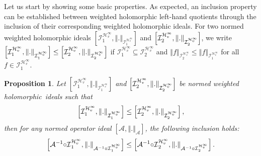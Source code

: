 \documentclass[12pt]{amsart}
\theoremstyle{plain}
\newtheorem{proposition}[theorem]{Proposition}
\numberwithin{equation}{section}
\begin{document}
Let us start by showing some basic properties. 
As expected, an inclusion property can be established between weighted
holomorphic left-hand quotients through the inclusion of their corresponding
weighted holomorphic ideals. For two normed weighted holomorphic  ideals $\left[ \mathcal{I}_{1}^{\mathcal{H}_{v}^{\infty }},\left\Vert
.\right\Vert _{\mathcal{I}_{1}^{\mathcal{H}_{v}^{\infty }}}\right] $ and $%
\left[ \mathcal{I}_{2}^{\mathcal{H}_{v}^{\infty }},\left\Vert .\right\Vert _{%
\mathcal{I}_{2}^{\mathcal{H}_{v}^{\infty }}}\right] $, we
write $\left[ \mathcal{I}_{1}^{\mathcal{H}_{v}^{\infty }},\left\Vert .\right\Vert _{%
\mathcal{I}_{1}^{\mathcal{H}_{v}^{\infty }}}\right] \leq \left[ \mathcal{I}%
_{2}^{\mathcal{H}_{v}^{\infty }},\left\Vert .\right\Vert _{\mathcal{I}_{2}^{%
\mathcal{H}_{v}^{\infty }}}\right] $ if $\mathcal{I}_{1}^{\mathcal{H}_{v}^{\infty }}\subseteq \mathcal{I}_{2}^{\mathcal{H}_{v}^{\infty }}$ and $\left\Vert
f\right\Vert _{\mathcal{I}_{2}^{\mathcal{H}_{v}^{\infty }}}\leq \left\Vert f\right\Vert _{\mathcal{I}_{1}^{\mathcal{H}_{v}^{\infty }}}$ for all $f\in \mathcal{I}_{1}^{\mathcal{H}_{v}^{\infty }}.$

\begin{proposition}\label{inclusion}
Let $\left[ \mathcal{I}_{1}^{\mathcal{H}_{v}^{\infty }},\left\Vert
.\right\Vert _{\mathcal{I}_{1}^{\mathcal{H}_{v}^{\infty }}}\right] $ and $%
\left[ \mathcal{I}_{2}^{\mathcal{H}_{v}^{\infty }},\left\Vert .\right\Vert _{%
\mathcal{I}_{2}^{\mathcal{H}_{v}^{\infty }}}\right] $ be normed weighted
holomorphic\ ideals such that%
\begin{equation*}
\left[ \mathcal{I}_{1}^{\mathcal{H}_{v}^{\infty }},\left\Vert .\right\Vert _{%
\mathcal{I}_{1}^{\mathcal{H}_{v}^{\infty }}}\right] \leq \left[ \mathcal{I}%
_{2}^{\mathcal{H}_{v}^{\infty }},\left\Vert .\right\Vert _{\mathcal{I}_{2}^{%
\mathcal{H}_{v}^{\infty }}}\right] ,
\end{equation*}%
then for any normed operator ideal $\left[ \mathcal{A},\left\Vert
.\right\Vert _{\mathcal{A}}\right] $, the following inclusion holds:%
\begin{equation*}
\left[ \mathcal{A}^{-1}\mathcal{\circ I}_{1}^{\mathcal{H}_{v}^{\infty
}},\left\Vert .\right\Vert _{\mathcal{A}^{-1}\mathcal{\circ I}_{1}^{\mathcal{%
H}_{v}^{\infty }}}\right] \leq \left[ \mathcal{A}^{-1}\mathcal{\circ I}_{2}^{%
\mathcal{H}_{v}^{\infty }},\left\Vert .\right\Vert _{\mathcal{A}^{-1}%
\mathcal{\circ I}_{2}^{\mathcal{H}_{v}^{\infty }}}\right] .
\end{equation*}
\end{proposition}
\end{document}
